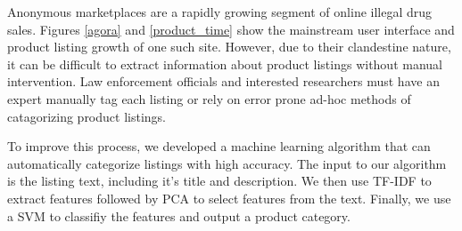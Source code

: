Anonymous marketplaces are a rapidly growing segment of online illegal drug
sales. Figures \ref{agora} and \ref{product_time} show the mainstream user
interface and product listing growth of one such site.
However, due to their clandestine nature, it can be difficult to extract information about product listings without manual intervention.
Law enforcement officials and interested researchers must have an expert manually tag each listing or rely on error prone ad-hoc methods of catagorizing product listings.

To improve this process, we developed a machine learning algorithm that can
automatically categorize listings with high accuracy. The input to our algorithm
is the listing text, including it's title and description. We then use TF-IDF to
extract features followed by PCA to select features from the text.  Finally, we
use a SVM to classifiy the features and output a product category.

